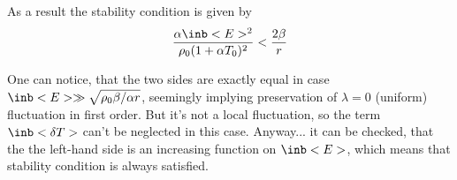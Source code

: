 As a result the stability condition is given by
\begin{equation}
    \frac{\alpha \inb<E>^2}{\rho_0 (1+\alpha T_0)^2} < \frac{2\beta}{r}
\end{equation}

One can notice, that the two sides are exactly equal
in case $\inb<E> \gg \sqrt{\rho_0 \beta/\alpha r}$,
seemingly implying preservation of $\lambda=0$ (uniform) fluctuation in first order.
But it's not a local fluctuation,
so the term $\inb<{\delta T}>$ can't be neglected in this case.
Anyway... it can be checked,
that the the left-hand side is an increasing function on $\inb<E>$,
which means that stability condition is always satisfied.

